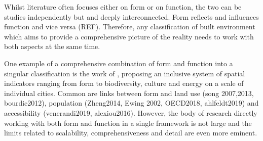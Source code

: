 




Whilst literature often focuses either on form or on function, the two can be studies
independently but and deeply interconnected. Form reflects and influences function and
vice versa (REF). Therefore, any classification of built environment which aims to
provide a comprehensive picture of the reality needs to work with both aspects at the
same time. 


One example of a comprehensive combination of form and function into a singular
classification is the work of \cite{bourdic2012}, proposing an inclusive system of
spatial indicators ranging from form to biodiversity, culture and energy on a scale of
individual cities. Common are links between form and land use (song 2007,2013,
bourdic2012), population (Zheng2014, Ewing 2002, OECD2018, ahlfeldt2019) and
accessibility (venerandi2019, alexiou2016). However, the body of research directly
working with both form and function in a single framework is not large and the limits
related to scalability, comprehensiveness and detail are even more eminent.





